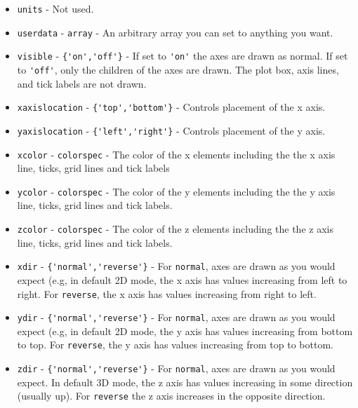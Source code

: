 \begin{itemize}
\item  \verb|units| - Not used.

\item  \verb|userdata| - \verb|array| - An arbitrary array you can set to anything you want.

\item  \verb|visible| - \verb|{'on','off'}| - If set to \verb|'on'| the axes are drawn as normal.
 If set to \verb|'off'|, only the children of the axes are drawn. The plot box, axis lines,
 and tick labels are not drawn.

\item  \verb|xaxislocation| - \verb|{'top','bottom'}| - Controls placement of the x axis.

\item  \verb|yaxislocation| - \verb|{'left','right'}| - Controls placement of the y axis.

\item  \verb|xcolor| - \verb|colorspec| - The color of the x elements including the the x axis
 line, ticks, grid lines and tick labels

\item  \verb|ycolor| - \verb|colorspec| - The color of the y elements including the the y axis
 line, ticks, grid lines and tick labels.

\item  \verb|zcolor| - \verb|colorspec| - The color of the z elements including the the z axis
 line, ticks, grid lines and tick labels.

\item  \verb|xdir| - \verb|{'normal','reverse'}| - For \verb|normal|, axes are drawn as you
 would expect (e.g, in default 2D mode, the x axis has values increasing from left
 to right.  For \verb|reverse|, the x axis has values increasing from right to left.

\item  \verb|ydir| - \verb|{'normal','reverse'}| - For \verb|normal|, axes are drawn as you
 would expect (e.g, in default 2D mode, the y axis has values increasing from bottom
 to top.  For \verb|reverse|, the y axis has values increasing from top to bottom.

\item  \verb|zdir| - \verb|{'normal','reverse'}| - For \verb|normal|, axes are drawn as you
 would expect. In default 3D mode, the z axis has values increasing in some direction
 (usually up).  For \verb|reverse| the z axis increases in the opposite direction.


\end{itemize}
